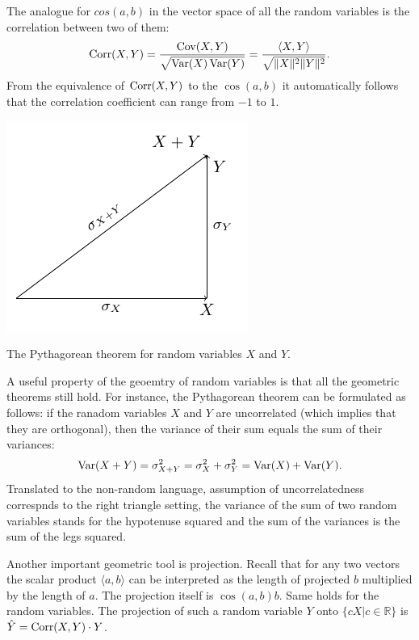 The analogue for $cos(a, b)$ in the vector space of all the random
variables is the correlation between two of them:
\[
\operatorname{Corr}(X,Y) = \frac{\operatorname{Cov}(X,Y)}{\sqrt{\operatorname{Var}(X)\operatorname{Var}(Y)}} = \frac{\langle X, Y \rangle}{\sqrt{\lVert X \rVert^2 \lVert Y \rVert^2}}.
\]
From the equivalence of $\operatorname{Corr}(X,Y)$ to the $\cos(a, b)$ it
automatically follows that the correlation coefficient can range from $-1$ to $1$.

\begin{marginfigure}[10\baselineskip]
\includegraphics{figures/01_pythagorean_theorem.pdf}
\caption{The Pythagorean theorem for random variables $X$ and $Y$.}
\label{fig:rv_pyth}
\end{marginfigure}

A useful property of the geoemtry of random variables is that all the
geometric theorems still hold. For instance, the Pythagorean theorem can
be formulated as follows: if the ranadom variables $X$ and $Y$ are uncorrelated
(which implies that they are orthogonal), then the variance of their sum equals
the sum of their variances:
\[
\operatorname{Var}(X + Y) = \sigma^2_{X+Y} = \sigma^2_{X} + \sigma^2_{Y} = \operatorname{Var}(X) + \operatorname{Var}(Y).
\]
Translated to the non-random language, assumption of uncorrelatedness correspnds
to the right triangle setting, the variance of the sum of two random variables
stands for the hypotenuse squared and the sum of the variances is the sum of
the legs squared.

Another important geometric tool is projection.
Recall that for any two vectors the scalar product $\langle a, b \rangle$
can be interpreted as the length of projected $b$ multiplied by the length of $a$.
The projection itself is $\cos(a, b) b$.
Same holds for the random variables.
The projection of such a random variable $Y$ onto $\{cX| c \in \mathbb{R}\}$ is
$\hat Y = \operatorname{Corr}(X,Y) \cdot Y$.

